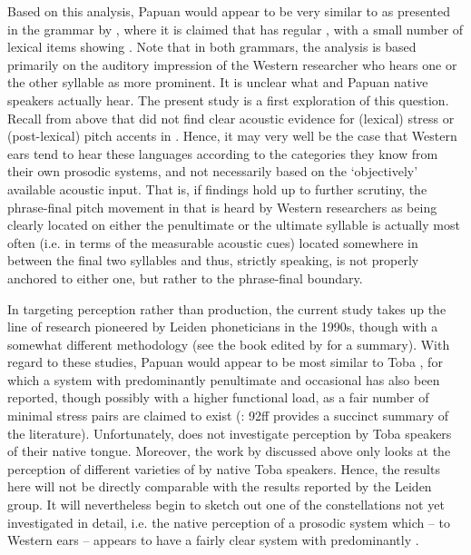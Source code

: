 \documentclass[output=paper
,modfonts
,nonflat]{langsci/langscibook}
\begin{document}
Based on this analysis, Papuan  would appear to be very similar to   as presented in the grammar by \citet{van1997}, where it is claimed that   has regular , with a small number of lexical items showing . Note that in both grammars, the analysis is based primarily on the auditory impression of the Western researcher who hears one or the other syllable as more prominent. It is unclear what  and Papuan  native speakers actually hear. The present study is a first exploration of this question. Recall from above that \citet{Maskikit-Essed2016} did not find clear acoustic evidence for (lexical) stress or (post-lexical) pitch accents in  . Hence, it may very well be the case that Western ears tend to hear these languages according to the categories they know from their own prosodic systems, and not necessarily based on the ‘objectively’ available acoustic input. That is, if  findings hold up to further scrutiny, the phrase-final pitch movement in   that is heard by Western researchers as being clearly located on either the penultimate or the ultimate syllable is actually most often (i.e. in terms of the measurable acoustic cues) located somewhere in between the final two syllables and thus, strictly speaking, is not properly anchored to either one, but rather to the phrase-final boundary. 

In targeting perception rather than production, the current study takes up the line of research pioneered by Leiden phoneticians in the 1990s, though with a somewhat different methodology (see the book edited by \citealt{van2007} for a summary). With regard to these studies, Papuan  would appear to be most similar to Toba , for which a system with predominantly penultimate and occasional  has also been reported, though possibly with a higher functional load, as a fair number of minimal stress pairs are claimed to exist (\citealt{Roosman2007}: 92ff provides a succinct summary of the literature). Unfortunately, \citet{Roosman2007} does not investigate  perception by Toba  speakers of their native tongue. Moreover, the work by \citet{Goedemans2007} discussed above only looks at the perception of different varieties of  by native Toba  speakers. Hence, the results here will not be directly comparable with the results reported by the Leiden group. It will nevertheless begin to sketch out one of the constellations not yet investigated in detail, i.e. the native perception of a prosodic system which – to Western ears – appears to have a fairly clear  system with predominantly . 
\end{document}
